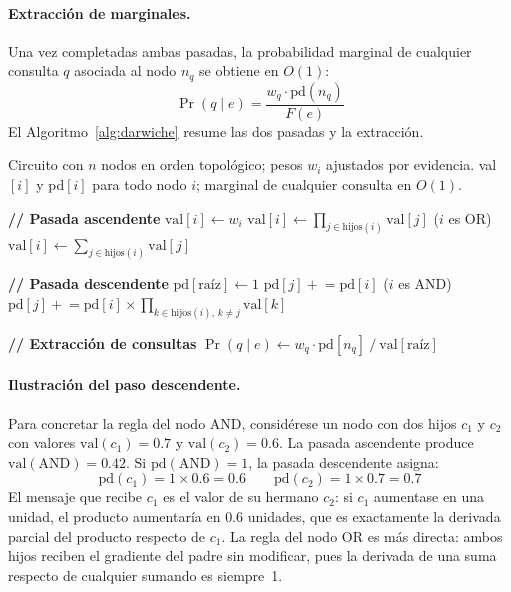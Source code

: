 \paragraph{Extracción de marginales.}
Una vez completadas ambas pasadas, la probabilidad marginal de cualquier consulta
$q$ asociada al nodo $n_q$ se obtiene en $O(1)$:
\begin{equation}
    \Pr(q \mid e) = \frac{w_q \cdot \text{pd}(n_q)}{F(e)}
    \label{eq:extraccion-marginal}
\end{equation}
El Algoritmo~\ref{alg:darwiche} resume las dos pasadas y la extracción.

\begin{algorithm}[H]
\caption{Diferenciación de circuitos d-DNNF (Darwiche, 2003)}
\label{alg:darwiche}
\begin{algorithmic}[1]
\Require Circuito con $n$ nodos en orden topológico;
    pesos $w_i$ ajustados por evidencia.
\Ensure val$[i]$ y pd$[i]$ para todo nodo $i$;
    marginal de cualquier consulta en $O(1)$.

\Statex \textbf{// Pasada ascendente}
        $\text{val}[i] \gets w_i$
        $\text{val}[i] \gets \prod_{j \in \text{hijos}(i)} \text{val}[j]$
    \Else \; ($i$ es OR)
        $\text{val}[i] \gets \sum_{j \in \text{hijos}(i)} \text{val}[j]$
    \EndIf
\EndFor

\Statex \textbf{// Pasada descendente}
\State $\text{pd}[\text{raíz}] \gets 1$
            $\text{pd}[j] \mathrel{+}= \text{pd}[i]$
        \Else \; ($i$ es AND)
            $\text{pd}[j] \mathrel{+}= \text{pd}[i] \times
                \prod_{k \in \text{hijos}(i),\, k \neq j} \text{val}[k]$
        \EndIf
    \EndFor
\EndFor

\Statex \textbf{// Extracción de consultas}
    \State $\Pr(q \mid e) \gets w_q \cdot \text{pd}[n_q] \ /\ \text{val}[\text{raíz}]$
\EndFor
\end{algorithmic}
\end{algorithm}

\paragraph{Ilustración del paso descendente.}
Para concretar la regla del nodo AND, considérese un nodo con dos hijos $c_1$ y
$c_2$ con valores $\text{val}(c_1) = 0.7$ y $\text{val}(c_2) = 0.6$. La pasada
ascendente produce $\text{val}(\text{AND}) = 0.42$. Si $\text{pd}(\text{AND}) = 1$,
la pasada descendente asigna:
\[
    \text{pd}(c_1) = 1 \times 0.6 = 0.6
    \qquad
    \text{pd}(c_2) = 1 \times 0.7 = 0.7
\]
El mensaje que recibe $c_1$ es el valor de su hermano $c_2$: si $c_1$ aumentase
en una unidad, el producto aumentaría en $0.6$ unidades, que es exactamente la
derivada parcial del producto respecto de $c_1$. La regla del nodo OR es más
directa: ambos hijos reciben el gradiente del padre sin modificar, pues la
derivada de una suma respecto de cualquier sumando es siempre~1.

